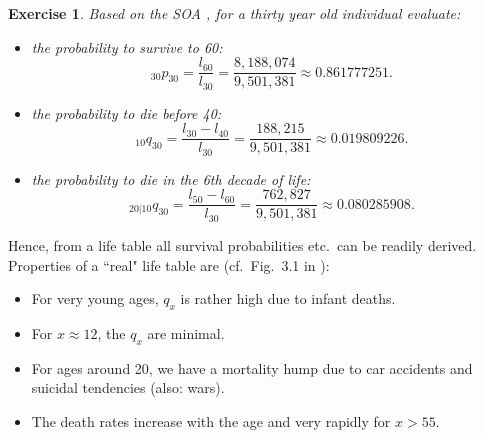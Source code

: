 \documentclass[11pt,fleqn,oneside]{book}
\newtheorem{exercise}{Exercise}
\begin{document}
\begin{exercise}
\label{EXLIFETAB2}
Based on the SOA , for a thirty year old individual evaluate:
\begin{itemize}
\item the probability to survive to 60:
$$
{_{30}p_{30}} = \frac{l_{60}}{l_{30}} = \frac{8,188,074}{9,501,381} \approx 0.861777251.
$$
\item the probability to die before 40:
$$
{_{10} q_{30}} = \frac{l_{30} - l_{40}}{l_{30}} = \frac{188,215}{9,501,381} \approx 0.019809226.
$$
\item the probability to die in the 6th decade of life:
$$
{_{20|10}q_{30}} = \frac{l_{50}-l_{60}}{l_{30}} = \frac{762,827}{9,501,381} \approx 0.080285908.
$$
\end{itemize} 
\end{exercise}
Hence, from a life table all survival probabilities etc.\ can be readily derived. Properties of a ``real" life table are (cf.\ Fig.\ 3.1 in \cite{DHW}):
\begin{itemize}
\item For very young ages, $q_x$ is rather high due to infant deaths.
\item For $x \approx 12$, the $q_x$ are minimal.
\item For ages around 20, we have a mortality hump due to car accidents and suicidal tendencies (also: wars).
\item The death rates increase with the age and very rapidly for $x>55$.
\end{itemize}

\end{document}
